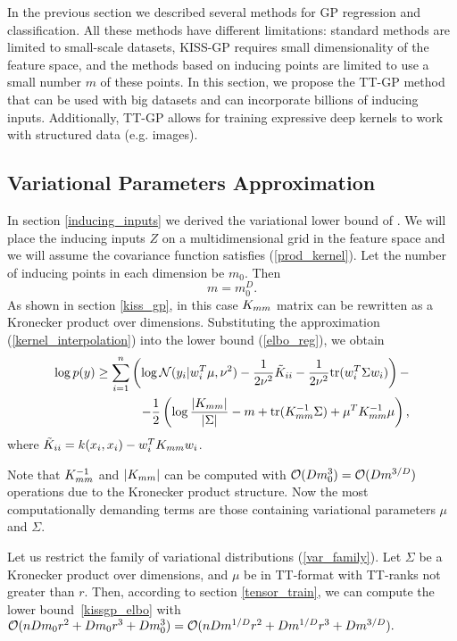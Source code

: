 In the previous section we described several methods for GP regression and
classification. All these methods have different limitations: standard methods
are limited to small-scale datasets, KISS-GP requires small dimensionality of
the feature space, and the methods based on inducing points are limited to use
a small number $m$ of these points. In this section, we propose the TT-GP method
that can be used with big datasets and can incorporate billions of inducing
inputs. Additionally, TT-GP allows for training expressive deep kernels to work
with structured data (e.g. images).

\subsection{Variational Parameters Approximation}
  In section \ref{inducing_inputs} we derived the variational lower bound of
  \citet{hensman2013}. We will place the inducing inputs $Z$ on a
  multidimensional grid in the feature space and we will assume the
  covariance function satisfies (\ref{prod_kernel}). Let the number
  of inducing points in each dimension be $m_0$. Then
  \[
    m = m_0^D.
  \]
  As shown in section \ref{kiss_gp},
  in this case $K_{mm}$ matrix can be rewritten as a Kronecker product over
  dimensions. Substituting the approximation (\ref{kernel_interpolation}) into
  the lower bound (\ref{elbo_reg}), we obtain
  \begin{equation}
  \label{kissgp_elbo}
    \begin{split}
      \log p(y) \ge
      \sum_{i=1}^n \left ( \log \mathcal{N} (y_i | w_i^T \mu, \nu^2) -
        \frac 1 {2\nu^2} \tilde K_{ii} -
        \frac 1 {2\nu^2} \mbox{tr} (w_i^T \Sigma w_i)
      \right )-
      \\
      - \frac 1 2 \left(
        \log \frac {|K_{mm}|} {|\Sigma|} - m + \mbox{tr}(K_{mm}^{-1} \Sigma) +
        \mu^T K_{mm}^{-1} \mu
      \right),
    \end{split}
  \end{equation}
  where $\tilde K_{ii} = k(x_i, x_i) - w_i^T K_{mm} w_i$.

  Note that $K_{mm}^{-1}$ and $|K_{mm}|$ can be computed with
  $\mathcal{O}(D m_0^3) = \mathcal{O}(D m^{3/D})$ operations due to the
  Kronecker product structure. Now the most computationally demanding terms
  are those containing variational parameters $\mu$ and $\Sigma$.

  Let us restrict the family of variational distributions (\ref{var_family}). Let $\Sigma$ be
  a Kronecker product over dimensions, and $\mu$ be in TT-format with TT-ranks
  not greater than $r$. Then, according to section \ref{tensor_train}, we can
  compute the lower bound~\eqref{kissgp_elbo} with
  $\mathcal{O}(nDm_0 r^2 + D m_0 r^3 + Dm_0^3) =
  \mathcal{O}(nD m^{1/D} r^2 + D m^{1/D} r^3 + D m^{3/D}).$

